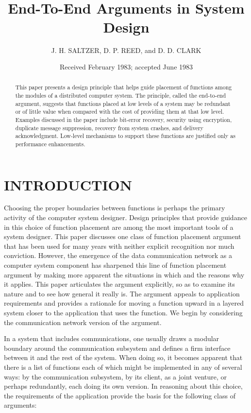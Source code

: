 \documentclass[a4paper,11pt,notitlepage,twoside,openright]{article}
\title{End-To-End Arguments in System Design}
\author{J. H. SALTZER, D. P. REED, and D. D. CLARK}
\date{Received February 1983; accepted June 1983}
\begin{document}
\maketitle

\begin{abstract}
This paper presents a design principle that helps guide placement of
functions among the modules of a distributed computer system. The
principle, called the end-to-end argument, suggests that functions
placed at low levels of a system may be redundant or of little value
when compared with the cost of providing them at that low level.
Examples discussed in the paper include bit-error recovery, security
using encryption, duplicate message suppression, recovery from system
crashes, and delivery acknowledgment. Low-level mechanisms to support
these functions are justified only as performance enhancements.
\end{abstract}

\hypertarget{introduction}{%
  \section{INTRODUCTION}\label{introduction}}

Choosing the proper boundaries between functions is perhaps the primary
activity of the computer system designer. Design principles that provide
guidance in this choice of function placement are among the most
important tools of a system designer. This paper discusses one class of
function placement argument that has been used for many years with
neither explicit recognition nor much conviction. However, the
emergence of the data communication network as a computer system
component has sharpened this line of function placement argument by
making more apparent the situations in which and the reasons why it
applies. This paper articulates the argument explicitly, so as to
examine its nature and to see how general it really is. The argument
appeals to application requirements and provides a rationale for moving
a function upward in a layered system closer to the application that
uses the function. We begin by considering the communication network
version of the argument.

In a system that includes communications, one usually draws a modular
boundary around the communication subsystem and defines a firm interface
between it and the rest of the system. When doing so, it becomes
apparent that there is a list of functions each of which might be
implemented in any of several ways: by the communication subsystem, by
its client, as a joint venture, or perhaps redundantly, each doing its
own version. In reasoning about this choice, the requirements of the
application provide the basis for the following class of arguments:
\end{document}
